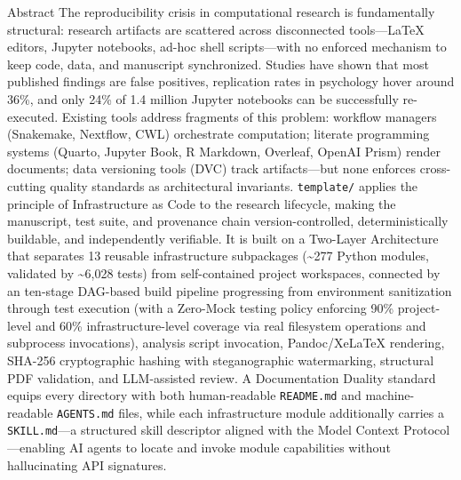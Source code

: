 \documentclass[
  ignorenonframetext,
]{beamer}
\author{\texorpdfstring{}{}}
\date{}
\begin{document}
\begin{frame}[fragile]{Abstract}
\protect{}\label{abstract}
The reproducibility crisis in computational research is fundamentally
structural: research artifacts are scattered across disconnected
tools---LaTeX editors, Jupyter notebooks, ad-hoc shell scripts---with no
enforced mechanism to keep code, data, and manuscript synchronized.
Studies have shown that most published findings are false positives,
replication rates in psychology hover around 36\%, and only 24\% of 1.4
million Jupyter notebooks can be successfully re-executed. Existing
tools address fragments of this problem: workflow managers (Snakemake,
Nextflow, CWL) orchestrate computation; literate programming systems
(Quarto, Jupyter Book, R Markdown, Overleaf, OpenAI Prism) render
documents; data versioning tools (DVC) track artifacts---but none
enforces cross-cutting quality standards as architectural invariants.
\texttt{template/} applies the principle of Infrastructure as Code to
the research lifecycle, making the manuscript, test suite, and
provenance chain version-controlled, deterministically buildable, and
independently verifiable. It is built on a Two-Layer Architecture that
separates 13 reusable infrastructure subpackages (\textasciitilde277
Python modules, validated by \textasciitilde6,028 tests) from
self-contained project workspaces, connected by an ten-stage DAG-based
build pipeline progressing from environment sanitization through test
execution (with a Zero-Mock testing policy enforcing 90\% project-level
and 60\% infrastructure-level coverage via real filesystem operations
and subprocess invocations), analysis script invocation, Pandoc/XeLaTeX
rendering, SHA-256 cryptographic hashing with steganographic
watermarking, structural PDF validation, and LLM-assisted review. A
Documentation Duality standard equips every directory with both
human-readable \texttt{README.md} and machine-readable
\texttt{AGENTS.md} files, while each infrastructure module additionally
carries a \texttt{SKILL.md}---a structured skill descriptor aligned with
the Model Context Protocol---enabling AI agents to locate and invoke
module capabilities without hallucinating API signatures.


\end{frame}
\end{document}
